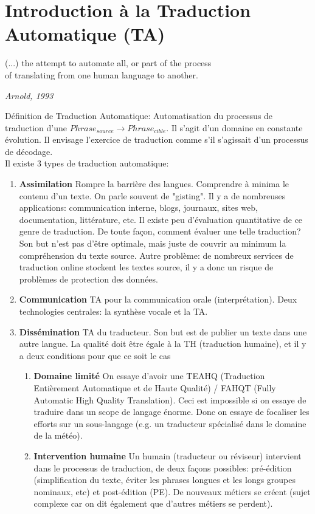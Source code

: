\vspace{-1.2cm}

\section{Introduction à la Traduction Automatique (TA)}

\epigraph{(...) the attempt to automate all, or part of the process\\ of translating from one human language to another.}{\textit{Arnold, 1993}}

Définition de Traduction Automatique: Automatisation du processus de traduction d'une $Phrase_{source} \rightarrow Phrase_{cible}$.
Il s'agit d'un domaine en constante évolution. Il envisage l'exercice de traduction comme s'il s'agissait d'un processus de décodage. \\

\noindent Il existe 3 types de traduction automatique:

\begin{enumerate}
    \item \textbf{Assimilation} Rompre la barrière des langues. Comprendre à minima le contenu d'un texte.
    On parle souvent de "gisting". Il y a de nombreuses applications: communication interne, blogs, journaux,
    sites web, documentation, littérature, etc. Il existe peu d'évaluation quantitative de ce genre de traduction.
    De toute façon, comment évaluer une telle traduction? Son but n'est pas d'être optimale, mais juste de couvrir
    au minimum la compréhension du texte source. Autre problème: de nombreux services de traduction online stockent
    les textes source, il y a donc un risque de problèmes de protection des données.
    \item \textbf{Communication} TA pour la communication orale (interprétation). Deux technologies centrales: la synthèse vocale et la TA.
    \item \textbf{Dissémination} TA du traducteur. Son but est de publier un texte dans une autre langue.
    La qualité doit être égale à la TH (traduction humaine), et il y a deux conditions pour que ce soit le cas
    \begin{enumerate}
        \item \textbf{Domaine limité} On essaye d'avoir une TEAHQ (Traduction Entièrement Automatique et de Haute Qualité) / FAHQT (Fully Automatic High Quality Translation).
        Ceci est impossible si on essaye de traduire dans un scope de langage énorme.
        Donc on essaye de focaliser les efforts sur un sous-langage (e.g. un traducteur spécialisé dans le domaine de la météo).
        \item \textbf{Intervention humaine} Un humain (traducteur ou réviseur) intervient dans le processus de traduction,
        de deux façons possibles: pré-édition (simplification du texte, éviter les phrases longues et les longs groupes nominaux, etc)
        et post-édition (PE). De nouveaux métiers se créent (sujet complexe car on dit également que d'autres métiers se perdent).
    \end{enumerate}
\end{enumerate}

